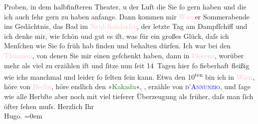                     Proben, in dem halbfinſteren Theater, u der Luft die Sie ſo gern haben und die
                    ich auch ſehr gern zu haben anfange. Dann kommen mir \textcolor{pink}{Wien}{}\ledrightnote{\textcolor{pink}{Wien}}er Sommerabende ins Gedächtnis, das Bad im \textcolor{pink}{Neufchatelerſee}{}\ledrightnote{\textcolor{pink}{Neuenburgersee}}, der letzte {\pb}Tag am Dampfſchiff und ich
                    denke mir, wie ſchön und gut es iſt, was für ein großes Glück, daſs ich Menſchen
                    wie Sie ſo früh hab finden und behalten dürfen.\pend
           \pstart
           Ich war bei den \textcolor{pink}{Thürmen}{}, von
                    denen Sie mir einen geſchenkt haben, dann in
                        \textcolor{pink}{Florenz}{}\ledrightnote{\textcolor{pink}{Florenz}}, worüber mehr als viel zu erzählen
                    iſt und ſitze nun ſeit 14 Tagen hier ſo fieberhaft fleißig wie ichs manchmal und
                    leider ſo ſelten ſein kann. Etwa den 10\textsuperscript{ten} bin ich
                    in \textcolor{pink}{Wien}{}\ledrightnote{\textcolor{pink}{Wien}}, höre von \textcolor{pink}{Berlin}{}\ledrightnote{\textcolor{pink}{Berlin}}, höre endlich den »\textcolor{green}{Kakadu}{}\ledrightnote{\textcolor{green}{Der grüne Kakadu – Paracelsus – Die Gefährtin. Drei Einakter}}«,
                        \label{K_L00849_1v}\label{K_L00849_1h}, erzähle von \textcolor{blue}{\textsc{d’Annunzio}}{}\ledrightnote{\textcolor{blue}{Gabriele D’Annunzio}}, und ſage wie {\pb}alle
                    Herbſte aber noch mit viel tieferer Überzeugung als früher, daſs man ſich öfter
                    ſehen muſs.\pend
           \pstart
           Herzlich Ihr{\\[\baselineskip]}\spacefill\mbox{Hugo.}\pend
           \leftskip=0em{}\endnumbering{}  
      